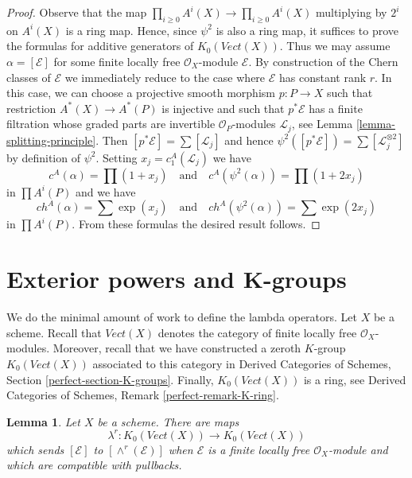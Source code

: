 \documentclass{stacks-project}
\theoremstyle{plain}
\newtheorem{lemma}[subsection]{Lemma}
\theoremstyle{definition}
\theoremstyle{remark}
\numberwithin{equation}{subsection}
\begin{document}
\begin{proof}
Observe that the map $\prod_{i \geq 0} A^i(X) \to \prod_{i \geq 0} A^i(X)$
multiplying by $2^i$ on $A^i(X)$ is a ring map. Hence, since $\psi^2$
is also a ring map, it suffices to prove the formulas for additive generators
of $K_0(\textit{Vect}(X))$. Thus we may assume $\alpha = [\mathcal{E}]$
for some finite locally free $\mathcal{O}_X$-module $\mathcal{E}$.
By construction of the Chern classes of $\mathcal{E}$ we immediately
reduce to the case where $\mathcal{E}$ has constant rank $r$.
In this case, we can choose a projective smooth morphism $p : P \to X$
such that restriction $A^*(X) \to A^*(P)$ is injective
and such that $p^*\mathcal{E}$ has a finite filtration whose
graded parts are invertible $\mathcal{O}_P$-modules $\mathcal{L}_j$, see
Lemma \ref{lemma-splitting-principle}. Then
$[p^*\mathcal{E}] = \sum [\mathcal{L}_j]$ and hence
$\psi^2([p^*\mathcal{E}]) = \sum [\mathcal{L}_j^{\otimes 2}]$
by definition of $\psi^2$. Setting $x_j  = c^A_1(\mathcal{L}_j)$
we have
$$
c^A(\alpha) = \prod (1 + x_j)
\quad\text{and}\quad
c^A(\psi^2(\alpha)) = \prod (1 + 2 x_j)
$$
in $\prod A^i(P)$ and we have
$$
ch^A(\alpha) = \sum \exp(x_j)
\quad\text{and}\quad
ch^A(\psi^2(\alpha)) = \sum \exp(2 x_j)
$$
in $\prod A^i(P)$. From these formulas the desired result follows.
\end{proof}







\section{Exterior powers and K-groups}
\label{section-lambda-operations}

\noindent
We do the minimal amount of work to define the lambda operators.
Let $X$ be a scheme. Recall that $\textit{Vect}(X)$ denotes the
category of finite locally free $\mathcal{O}_X$-modules.
Moreover, recall that we have constructed a zeroth $K$-group
$K_0(\textit{Vect}(X))$ associated to this category in
Derived Categories of Schemes, Section \ref{perfect-section-K-groups}.
Finally, $K_0(\textit{Vect}(X))$ is a ring, see
Derived Categories of Schemes, Remark \ref{perfect-remark-K-ring}.

\begin{lemma}
\label{lemma-lambda-operations}
Let $X$ be a scheme. There are maps
$$
\lambda^r : K_0(\textit{Vect}(X)) \longrightarrow K_0(\textit{Vect}(X))
$$
which sends $[\mathcal{E}]$ to $[\wedge^r(\mathcal{E})]$
when $\mathcal{E}$ is a finite locally free $\mathcal{O}_X$-module
and which are compatible with pullbacks.
\end{lemma}
\end{document}
